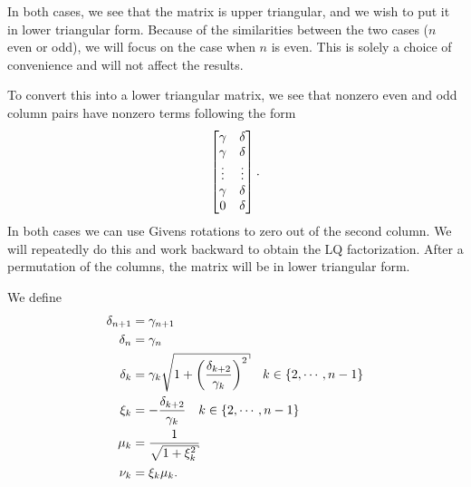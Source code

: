 In both cases, we see that the matrix is upper triangular,
and we wish to put it in lower triangular form.
Because of the similarities between the two cases ($n$ even or odd),
we will focus on the case when $n$ is even. This is solely
a choice of convenience and will not affect the results.

To convert this into a lower triangular matrix, we see that nonzero
even and odd column pairs have nonzero terms following the form
%
\begin{equation}
    \begin{bmatrix}
        \gamma & \delta \\
        \gamma & \delta \\
        \vdots & \vdots \\
        \gamma & \delta \\
        0 & \delta \\
    \end{bmatrix}.
\end{equation}
%
In both cases we can use Givens rotations to zero out of the second
column. We will repeatedly do this and work backward to obtain the
LQ factorization.
After a permutation of the columns,
the matrix will be in lower triangular form.

We define
%
\begin{align}
    \del_{n+1} &= \gamma_{n+1} \nonumber\\
    \del_{n} &= \gamma_{n} \nonumber\\
    \del_{k} &= \gamma_{k}\sqrt{1 + \parens{\frac{\del_{k+2}}{\gamma_{k}}}^{2}}
        \quad k\in\braces{2,\cdots,n-1} \nonumber\\
    \xi_{k} &= -\frac{\del_{k+2}}{\gamma_{k}} \quad k\in\braces{2,\cdots,n-1}
        \nonumber\\
    \mu_{k} &= \frac{1}{\sqrt{1 + \xi_{k}^{2}}}
        \nonumber\\
    \nu_{k} &= \xi_{k}\mu_{k}.
\end{align}

